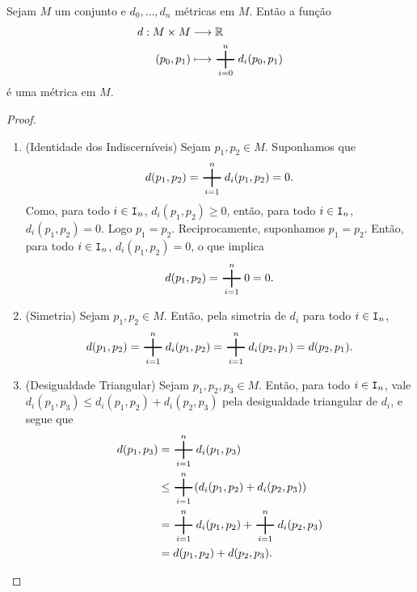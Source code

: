 \begin{prop}
	Sejam $M$ um conjunto e $d_0, \dots, d_n$ métricas em $M$. Então a função
	\begin{align*}
		\func{d}{M \times M}{\R}{(p_0,p_1)}{\bigplus_{i=0}^n d_i(p_0,p_1)}
	\end{align*}
é uma métrica em $M$.
\end{prop}
\begin{proof}
	\begin{enumerate}
	\item (Identidade dos Indiscerníveis) Sejam $p_1,p_2 \in M$. Suponhamos que
	\begin{equation*}
	d(p_1,p_2) = \bigplus_{i=1}^n d_i(p_1,p_2) = 0.
	\end{equation*}
Como, para todo $i \in \mathtt I_n$, $d_i(p_1,p_2) \geq 0$, então, para todo $i \in \mathtt I_n$, $d_i(p_1,p_2) = 0$. Logo $p_1=p_2$. Reciprocamente, suponhamos $p_1=p_2$. Então, para todo $i \in \mathtt I_n$, $d_i(p_1,p_2)=0$, o que implica
	\begin{equation*}
	d(p_1,p_2) = \bigplus_{i=1}^n 0 = 0.
	\end{equation*}
	
	\item (Simetria) Sejam $p_1,p_2 \in M$. Então, pela simetria de $d_i$ para todo $i \in \mathtt I_n$,
	\begin{equation*}
	d(p_1,p_2) = \bigplus_{i=1}^n d_i(p_1,p_2) = \bigplus_{i=1}^n d_i(p_2,p_1) = d(p_2,p_1).
	\end{equation*}
	
	\item (Desigualdade Triangular) Sejam $p_1,p_2,p_3 \in M$. Então, para todo $i \in \mathtt I_n$, vale $d_i(p_1,p_3) \leq d_i(p_1,p_2)+d_i(p_2,p_3)$ pela desigualdade triangular de $d_i$, e segue que
	\begin{align*}
	d(p_1,p_3) &= \bigplus_{i=1}^n d_i(p_1,p_3) \\
				&\leq \bigplus_{i=1}^n (d_i(p_1,p_2)+d_i(p_2,p_3)) \\
				&= \bigplus_{i=1}^n d_i(p_1,p_2) + \bigplus_{i=1}^n d_i(p_2,p_3) \\
				&= d(p_1,p_2)+d(p_2,p_3).
	\end{align*}
	\end{enumerate}
\end{proof}

